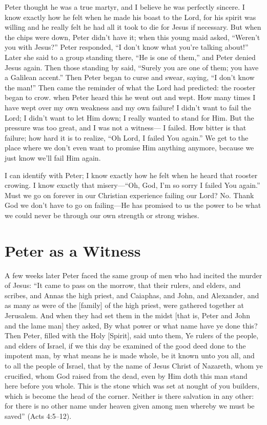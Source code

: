 Peter thought he was a true martyr, and I believe he was
perfectly sincere. I know exactly how he felt when he made
his boast to the Lord, for his spirit was willing and he really
felt he had all it took to die for Jesus if necessary. But when
the chips were down, Peter didn’t have it; when this young
maid asked, “Weren’t you with Jesus?” Peter responded, “I
don’t know what you’re talking about!” Later she said to a
group standing there, “He is one of them,” and Peter denied
Jesus again. Then those standing by said, “Surely you are
one of them; you have a Galilean accent.” Then Peter began
to curse and swear, saying, “I don’t know the man!” Then
came the reminder of what the Lord had predicted: the
rooster began to crow. when Peter heard this he went out
and wept. How many times I have wept over my own
weakness and my own failure! I didn’t want to fail the Lord;
I didn’t want to let Him down; I really wanted to stand for
Him. But the pressure was too great, and I was not a witness—
I failed. How bitter is that failure; how hard it is to
realize, “Oh Lord, I failed You again.” We get to the place
where we don’t even want to promise Him anything anymore,
because we just know we’ll fail Him again.

I can identify with Peter; I know exactly how he felt
when he heard that rooster crowing. I know exactly that
misery—“Oh, God, I’m so sorry I failed You again.” Must
we go on forever in our Christian experience failing our
Lord? No. Thank God we don’t have to go on failing—He
has promised to us the power to be what we could never be
through our own strength or strong wishes.


\section*{Peter as a Witness}

A few weeks later Peter faced the same group of men
who had incited the murder of Jesus: “It came to pass on
the morrow, that their rulers, and elders, and scribes, and
Annas the high priest, and Caiaphas, and John, and Alexander,
and as many as were of the [family] of the high priest,
were gathered together at Jerusalem. And when they had
set them in the midst [that is, Peter and John and the lame
man] they asked, By what power or what name have ye
done this? Then Peter, filled with the Holy [Spirit], said unto
them, Ye rulers of the people, and elders of Israel, if we this
day be examined of the good deed done to the impotent
man, by what means he is made whole, be it known unto
you all, and to all the people of Israel, that by the name of
Jesus Christ of Nazareth, whom ye crucified, whom God
raised from the dead, even by Him doth this man stand here
before you whole. This is the stone which was set at nought
of you builders, which is become the head of the corner.
Neither is there salvation in any other: for there is no other
name under heaven given among men whereby we must be
saved” (Acts 4:5–12).

